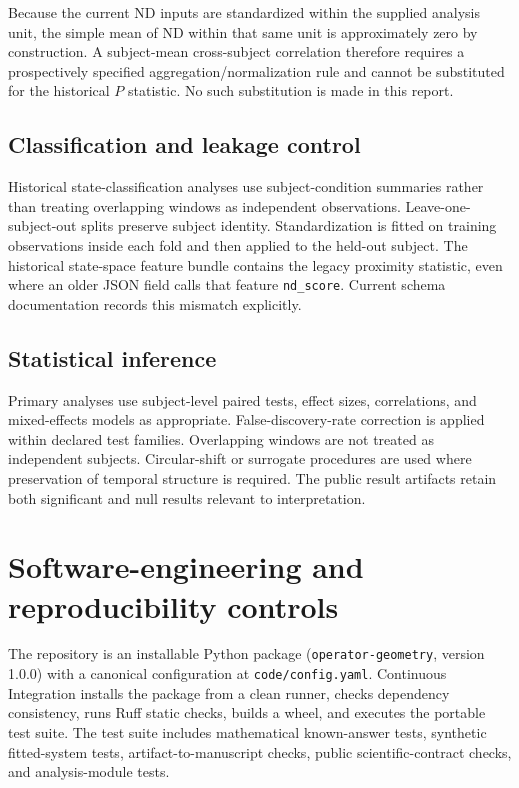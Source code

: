 \documentclass[preprint,12pt,nonatbib]{elsarticle}
\begin{document}
Because the current ND inputs are standardized within the supplied analysis unit, the simple mean of ND within that same unit is approximately zero by construction. A subject-mean cross-subject correlation therefore requires a prospectively specified aggregation/normalization rule and cannot be substituted for the historical $P$ statistic. No such substitution is made in this report.

\subsection{Classification and leakage control}
Historical state-classification analyses use subject-condition summaries rather than treating overlapping windows as independent observations. Leave-one-subject-out splits preserve subject identity. Standardization is fitted on training observations inside each fold and then applied to the held-out subject. The historical state-space feature bundle contains the legacy proximity statistic, even where an older JSON field calls that feature \texttt{nd\_score}. Current schema documentation records this mismatch explicitly.

\subsection{Statistical inference}
Primary analyses use subject-level paired tests, effect sizes, correlations, and mixed-effects models as appropriate. False-discovery-rate correction is applied within declared test families. Overlapping windows are not treated as independent subjects. Circular-shift or surrogate procedures are used where preservation of temporal structure is required. The public result artifacts retain both significant and null results relevant to interpretation.

\section{Software-engineering and reproducibility controls}
The repository is an installable Python package (\texttt{operator-geometry}, version 1.0.0) with a canonical configuration at \texttt{code/config.yaml}. Continuous Integration installs the package from a clean runner, checks dependency consistency, runs Ruff static checks, builds a wheel, and executes the portable test suite. The test suite includes mathematical known-answer tests, synthetic fitted-system tests, artifact-to-manuscript checks, public scientific-contract checks, and analysis-module tests.
\end{document}
